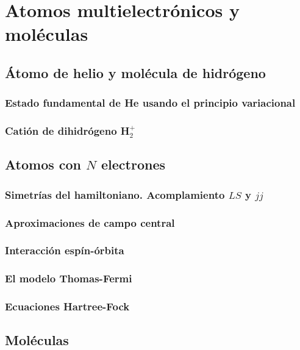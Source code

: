 \chapter{Atomos multielectrónicos y moléculas}

\section{Átomo de helio y molécula de hidrógeno}

\subsection{Estado fundamental de He usando el principio variacional}

\subsection{Catión de dihidrógeno H$_2^+$}

\section{Atomos con $N$ electrones}

\subsection{Simetrías del hamiltoniano. Acomplamiento $LS$ y $jj$}

\subsection{Aproximaciones de campo central}

\subsection{Interacción espín-órbita}

\subsection{El modelo Thomas-Fermi}

\subsection{Ecuaciones Hartree-Fock}

\section{Moléculas}

